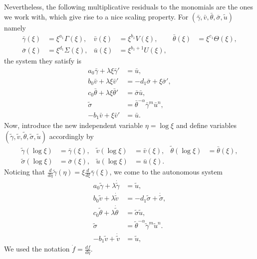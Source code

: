 \documentclass[a4paper,11pt]{article}
\def\bg{{\bar{\gamma}}}
\def\bv{{\bar{v}}}
\def\bth{{\bar{\theta}}}
\def\bs{{\bar{\sigma}}}
\def\bu{{\bar{u}}}
\def\tg{{\tilde{\gamma}}}
\def\tv{{\tilde{v}}}
\def\tth{{\tilde{\theta}}}
\def\ts{{\tilde{\sigma}}}
\def\tu{{\tilde{u}}}
\def\dtg{{\dot{\tilde{\gamma}}}}
\def\dtv{{\dot{\tilde{v}}}}
\def\dtth{{\dot{\tilde{\theta}}}}
\def\dts{{\dot{\tilde{\sigma}}}}
\begin{document}
% 

Nevertheless, the following multiplicative residuals to the monomials are the ones we work with, which give rise to a nice scaling property. For $(\bg,\bv,\bth,\bs,\tu)$ namely
\begin{equation} \label{eq:CAPtoBAR}
\begin{aligned}
 \bg(\xi)&=\xi^{a_1}\Gamma(\xi), &
 \bv(\xi)&=\xi^{b_1}V(\xi), &
 \bth(\xi)&=\xi^{c_1}\Theta(\xi), \\
 \bs(\xi)&=\xi^{d_1}\Sigma(\xi), &
 \bu(\xi)&=\xi^{b_1+1}U(\xi),
\end{aligned}
\end{equation}
the system they satisfy is
\begin{equation} \label{eq:barsys}
 \begin{aligned}
  a_0\bg + \lambda\xi\bg' &=\bu,\\
  b_0\bv + \lambda\xi\bv' &=-d_1 \bs + \xi\bs',\\
  c_0\bth+ \lambda\xi\bth'&=\bs\bu,\\
  \ts &=\bth^{-\alpha}\bg^m\bu^n,\\
  -b_1\bv+\xi\bv' &= \bu.
 \end{aligned}
\end{equation}
Now, introduce the new independent variable $\eta = \log\xi$ and define variables $(\tg,\tv,\tth,\ts,\tu)$ accordingly by
\begin{equation} \label{eq:BARtoTIL}
\begin{aligned}
 \tg(\log\xi)&=\bg(\xi), &
 \tv(\log\xi)&=\bv(\xi), &
 \tth(\log\xi)&=\bth(\xi), \\
 \ts(\log\xi)&=\bs(\xi), &
 \tu(\log\xi)&=\bu(\xi).
\end{aligned}
\end{equation}
Noticing that $\frac{d}{d\eta}\tg(\eta) = \xi \frac{d}{d\xi}\bg(\xi)$, we come to the autonomous system
\begin{equation} \label{eq:tildesys}
 \begin{aligned}
  a_0\tg + \lambda\dtg &=\tu,\\
  b_0\tv + \lambda\dtv &=-d_1 \ts + \dts,\\
  c_0\tth+ \lambda\dtth&=\ts\tu,\\
  \ts &=\tth^{-\alpha}\tg^m\tu^n.\\
  -b_1\tv+\dtv &= \tu,
 \end{aligned}
\end{equation}
We used the notation $\dot{f}=\frac{df}{d\eta}$.
\end{document}

